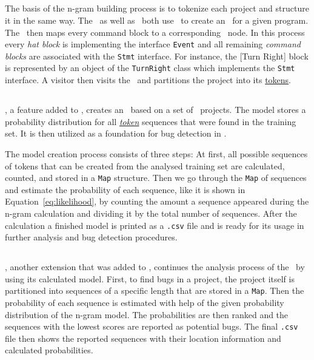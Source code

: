 \subsection{\tokenizer{}}\label{subsec:tokenizer}
The basis of the n-gram building process is to tokenize each project and structure it in the same way. The \ngramtrainer\ as well as \ngrambugfinder\ both use \litterbox\ to create an \AST\ for a given program. The \AST\ then maps every command block to a corresponding \AST\ node. In this process every \textit{hat block} is implementing the interface \texttt{Event} and all remaining \textit{command blocks} are associated with the \texttt{Stmt} interface. For instance, the [Turn Right] block is represented by an object of the \texttt{TurnRight} class which implements the \texttt{Stmt} interface. A visitor then visits the \AST\ and partitions the project into its \hyperref[def:token]{tokens}.

\subsection{\ngramtrainer{}}\label{subsec:ngramtrainer}
\ngramtrainer{}, a feature added to \litterbox{}, creates an \ngram\ based on a set of \scratch\ projects. The model stores a probability distribution for all \hyperref[def:token]{\textit{token}} sequences that were found in the training set. It is then utilized as a foundation for bug detection in \scratch{}.

The model creation process consists of three steps: At first, all possible sequences of tokens that can be created from the analysed training set are calculated, counted, and stored in a \texttt{Map} structure. Then we go through the \texttt{Map} of sequences and estimate the probability of each sequence, like it is shown in Equation~\ref{eq:likelihood}, by counting the amount a sequence appeared during the n-gram calculation and dividing it by the total number of sequences. After the calculation a finished model is printed as a \texttt{.csv} file and is ready for its usage in further analysis and bug detection procedures.

\subsection{\ngrambugfinder{}}\label{subsec:ngrambugfinder}
\ngrambugfinder{}, another extension that was added to \litterbox{}, continues the analysis process of the \ngramtrainer\ by using its calculated model. First, to find bugs in a project, the project itself is partitioned into sequences of a specific length that are stored in a \texttt{Map}. Then the probability of each sequence is estimated with help of the given probability distribution of the n-gram model. The probabilities are then ranked and the sequences with the lowest scores are reported as potential bugs. The final \texttt{.csv} file then shows the reported sequences with their location information and calculated probabilities.